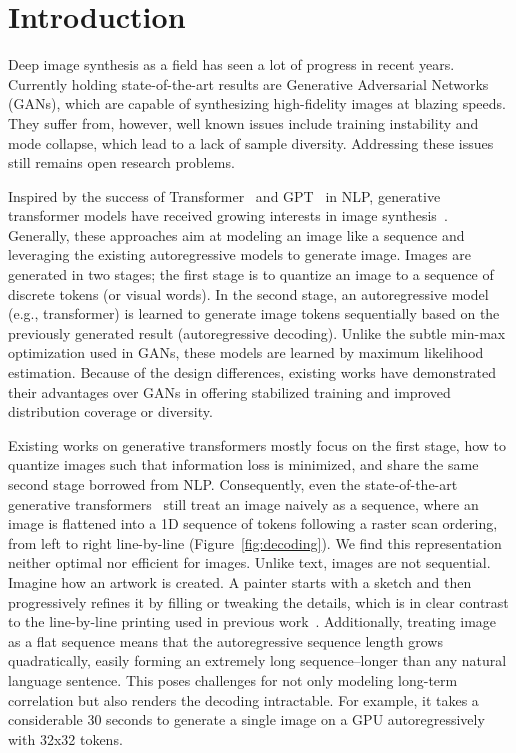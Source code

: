 \section{Introduction}
\label{sec:intro}



Deep image synthesis as a field has seen a lot of progress in recent years. Currently holding state-of-the-art results are Generative Adversarial Networks (GANs), which are capable of synthesizing high-fidelity images at blazing speeds. They suffer from, however, well known issues include training instability and mode collapse, which lead to a lack of sample diversity. Addressing these issues still remains open research problems.

Inspired by the success of Transformer~\cite{Vaswani17attention} and GPT~\cite{gpt3} in NLP, generative transformer models have received  growing interests in image synthesis~\cite{chen2020imagegpt,Esser21vqgan,Razavi19vqvae2}. Generally, these approaches aim at modeling an image like a sequence and leveraging the existing autoregressive models to generate image. Images are generated in two stages; the first stage is to quantize an image to a sequence of discrete tokens (or visual words). In the second stage, an autoregressive model (e.g., transformer) is learned to generate image tokens sequentially based on the previously generated result (\ie autoregressive decoding). Unlike the subtle min-max optimization used in GANs, these models are learned by maximum likelihood estimation. Because of the design differences, existing works have demonstrated their advantages over GANs in offering stabilized training and improved distribution coverage or diversity.

Existing works on generative transformers mostly focus on the first stage, \ie how to quantize images such that information loss is minimized, and share the same second stage borrowed from NLP. Consequently, even the state-of-the-art generative transformers~\cite{Esser21vqgan,Ramesh21dalle} still treat an image naively as a sequence, where an image is flattened into a 1D sequence of tokens following a raster scan ordering, \ie from left to right line-by-line (\cf Figure~\ref{fig:decoding}). We find this representation neither optimal nor efficient for images. Unlike text, images are not sequential. Imagine how an artwork is created. A painter starts with a sketch and then progressively refines it by filling or tweaking the details, which is in clear contrast to the line-by-line printing used in previous work~\cite{chen2020imagegpt,Esser21vqgan}. Additionally, treating image as a flat sequence means that the autoregressive sequence length grows quadratically, easily forming an extremely long sequence--longer than any natural language sentence. This poses challenges for not only modeling long-term correlation but also renders the decoding intractable.  For example, it takes a considerable 30 seconds to generate a single image on a GPU autoregressively with 32x32 tokens.


